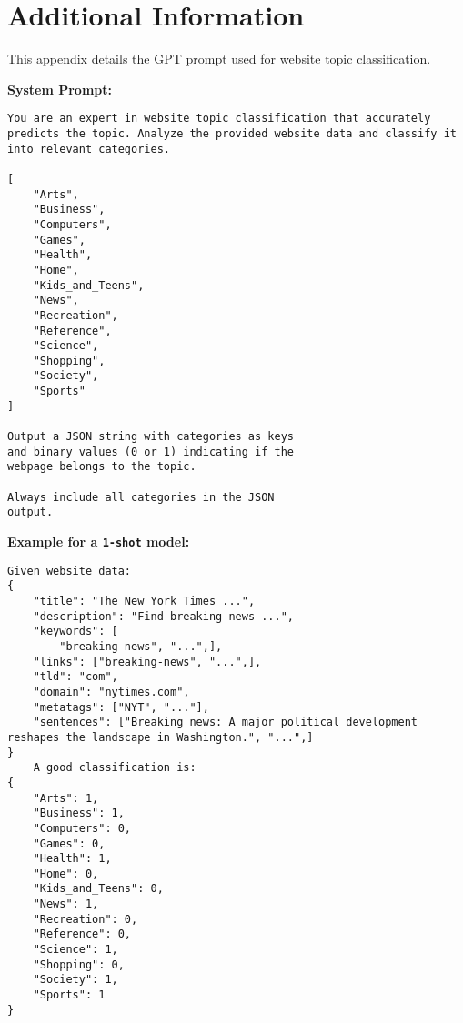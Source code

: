 \section{Additional Information}
\label{app:prompt}
This appendix details the GPT prompt used for website topic classification. 

\textbf{System Prompt:} 
\begin{quote}
\end{quote}

\begin{lstlisting}
You are an expert in website topic classification that accurately predicts the topic. Analyze the provided website data and classify it into relevant categories.

[
    "Arts",
    "Business",
    "Computers",
    "Games",
    "Health",
    "Home", 
    "Kids_and_Teens",
    "News",
    "Recreation",
    "Reference",
    "Science", 
    "Shopping",
    "Society",
    "Sports"
]

Output a JSON string with categories as keys
and binary values (0 or 1) indicating if the 
webpage belongs to the topic. 

Always include all categories in the JSON
output.
\end{lstlisting}
\textbf{Example for a \texttt{1-shot} model:}
\begin{lstlisting}
Given website data:
{         
    "title": "The New York Times ...",
    "description": "Find breaking news ...",
    "keywords": [
        "breaking news", "...",],
    "links": ["breaking-news", "...",],
    "tld": "com",
    "domain": "nytimes.com",
    "metatags": ["NYT", "..."],
    "sentences": ["Breaking news: A major political development reshapes the landscape in Washington.", "...",]
}
    A good classification is:
{
    "Arts": 1,
    "Business": 1,
    "Computers": 0,
    "Games": 0,
    "Health": 1,
    "Home": 0,
    "Kids_and_Teens": 0,
    "News": 1,
    "Recreation": 0,
    "Reference": 0,
    "Science": 1,
    "Shopping": 0,
    "Society": 1,
    "Sports": 1
}
\end{lstlisting}


